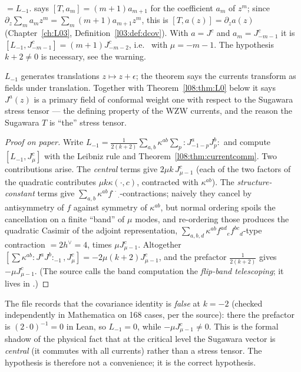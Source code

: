 \begin{dictionary}
 $= L_{-1}$.  says $[T,a_m] = (m+1)a_{m+1}$ for the coefficient
$a_m$ of $z^m$; since $\partial_z\sum_ma_mz^m = \sum_m(m+1)a_{m+1}z^m$, this is $[T,a(z)] = \partial_za(z)$
(Chapter~\ref{ch:L03}, Definition~\ref{l03:def:dcov}). With $a = J^c$ and $a_m = J^c_{-m-1}$ it is
$[L_{-1},J^c_{-m-1}] = (m+1)J^c_{-m-2}$, i.e.\  with $\mu=-m-1$.
The hypothesis $k+2\ne0$ is necessary, see the warning.
\end{dictionary}

\begin{physics}
$L_{-1}$ generates translations $z\mapsto z+\epsilon$; the theorem says the currents transform as
fields under translation. Together with Theorem~\ref{l08:thm:L0} below it says $J^a(z)$ is a primary
field of conformal weight one with respect to the Sugawara stress tensor --- the defining property of
the WZW currents, and the reason the Sugawara $T$ is ``the'' stress tensor.
\end{physics}

\begin{proof}[Proof on paper]
Write $L_{-1} = \frac{1}{2(k+2)}\sum_{a,b}\kappa^{ab}\sum_p{:}J^a_{-1-p}J^b_p{:}$ and compute
$[L_{-1},J^c_\mu]$ with the Leibniz rule and Theorem~\ref{l08:thm:currentcomm}. Two contributions arise.
The \emph{central} terms give $2\mu k\,J^c_{\mu-1}$ (each of the two factors of the quadratic
contributes $\mu k\kappa(\cdot,c)$, contracted with $\kappa^{ab}$). The \emph{structure-constant} terms
give $\sum_{a,b}\kappa^{ab}f^{\cdot\cdot}{}_\cdot$-contractions; naively they cancel by
antisymmetry of $f$ against symmetry of $\kappa^{ab}$, but normal ordering spoils the cancellation
on a finite ``band'' of $\mu$ modes, and re-ordering those produces the quadratic Casimir of the
adjoint representation, $\sum_{a,b,d}\kappa^{ab}f^{ad}{}_{e}f^{bc}{}_d$-type contraction $= 2h^\vee = 4$, times
$\mu J^c_{\mu-1}$. Altogether $[\sum\kappa^{ab}{:}J^aJ^b{:}_{-1},J^c_\mu] = -2\mu(k+2)J^c_{\mu-1}$, and the
prefactor $\frac1{2(k+2)}$ gives $-\mu J^c_{\mu-1}$. (The source calls the band computation the
\emph{flip-band telescoping}; it lives in .)
\end{proof}

\begin{warning}[title={The critical level}]
The file  records that the covariance identity is \emph{false} at
$k=-2$ (checked independently in Mathematica on 168 cases, per the source): there the prefactor is
$(2\cdot0)^{-1} = 0$ in Lean, so $L_{-1}=0$, while $-\mu J^c_{\mu-1}\ne0$. This is the formal shadow of
the physical fact that at the critical level the Sugawara vector is \emph{central} (it commutes with
all currents) rather than a stress tensor. The hypothesis  is therefore not a convenience; it
is the correct hypothesis.
\end{warning}

